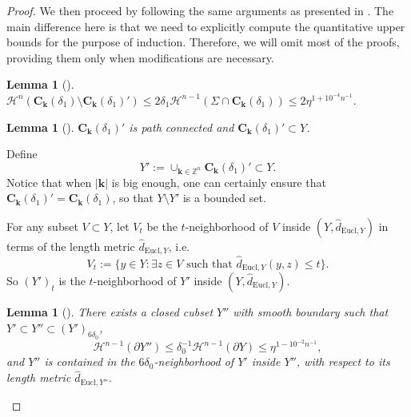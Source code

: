\documentclass[letter]{amsart}
\newtheorem{lem}[thm]{Lemma}
\theoremstyle{definition}
\theoremstyle{remark}
\begin{document}
\begin{proof}
 We then proceed by following the same arguments as presented in \cite[Section 4]{DS'23}. The main difference here is that we need to explicitly compute the quantitative upper bounds for the purpose of induction. Therefore, we will omit most of the proofs, providing them only when modifications are necessary.


\begin{lem}[{\cite[Lemma 4.3]{DS'23}}]\label{ooo-n}
	$\mathcal{H}^{n}( \mathbf{C}_{\mathbf{k}}(\delta _1)\setminus \mathbf{C}_{\mathbf{k}}(\delta _1)') \leq 2 \delta _1 \mathcal{H}^{n-1}(\Sigma \cap \mathbf{C}_{\mathbf{k}}(\delta _1) ) \leq 2\eta^{1+ 10^{-4}n^{-1}}.$	
\end{lem}

\begin{lem}[{\cite[Lemma 4.4]{DS'23}}]
	$\mathbf{C}_{\mathbf{k}}(\delta _1)'$ is path connected and $\mathbf{C}_{\mathbf{k}}(\delta _1)' \subset Y$.
\end{lem}	
	
Define 
	$$
	Y':= \cup _{\mathbf{k}\in \mathbb{Z}^n}\mathbf{C}_{\mathbf{k}}(\delta _1)' \subset Y.
	$$ 
	Notice that when $|\mathbf{k}|$ is big enough, one can certainly ensure that $\mathbf{C}_{\mathbf{k}}(\delta _1)'= \mathbf{C}_{\mathbf{k}}(\delta _1)$, so that $Y\setminus Y'$ is a bounded set. 


	For any subset $V \subset Y$, let $V_t$ be the $t$-neighborhood of $V$ inside $(Y, \hat{d}_{\mathrm{Eucl},Y})$ in terms of the length metric $\hat{d}_{\mathrm{Eucl},Y}$, i.e.
	$$
	V_{t }:= \{y \in Y: \exists z \in V \text{ such that }\hat{d}_{\mathrm{Eucl},Y}(y, z) \leq t  \} .
	$$ 
	So $(Y')_t$ is the $t$-neighborhood of $Y'$ inside $(Y, \hat{d}_{\mathrm{Eucl}, Y})$.


	\begin{lem}[{\cite[Lemma 4.5]{DS'23}}] \label{ybis-n}
	There exists a closed cubset $Y''$ with smooth boundary such that $Y'\subset Y'' \subset (Y')_{6 \delta _0} $,
	$$
	\mathcal{H}^{n-1}(\partial Y'' ) \leq \delta _0^{-1} \mathcal{H}^{n-1}(\partial Y) \leq \eta^{1- 10^{-2}n^{-1}},
	$$ 
	and
	$Y''$ is contained in the $6\delta_0$-neighborhood of $Y'$ inside $Y''$, with respect to its length metric $\hat{d}_{\mathrm{Eucl}, Y''}$.
	



\end{lem}
\end{proof}
\end{document}
